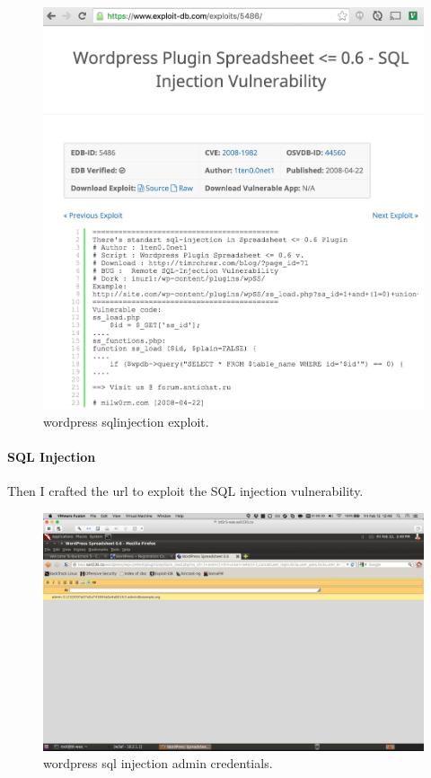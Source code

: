 \documentclass{article}
\begin{document}
\begin{figure}[h!]
	\includegraphics[width=\linewidth]{images/wp-exploitdb.png}
	\caption{wordpress sqlinjection exploit.}
	\label{fig:wordpress1}
\end{figure}

\newpage
\paragraph{SQL Injection}
Then I crafted the url to exploit the SQL injection vulnerability.

\begin{figure}[h!]
	\includegraphics[width=\linewidth]{images/wp-admin-credentials.png}
	\caption{wordpress sql injection admin credentials.}
	\label{fig:wordpress2}
\end{figure}
\end{document}
